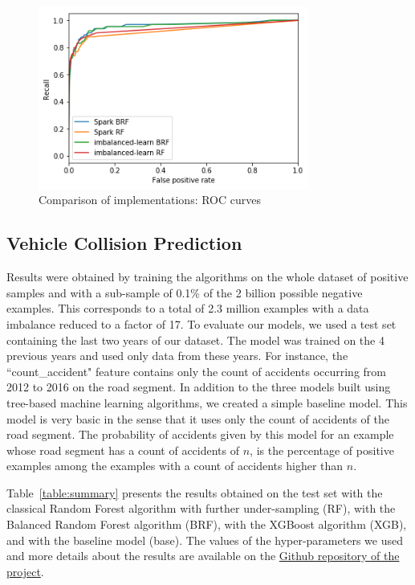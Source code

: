 \documentclass[conference]{IEEEtran}
\begin{document}
\begin{figure}[htbp]
\centerline{\includegraphics[height=6cm, keepaspectratio]{Figures/test_brf_roc.png}}
\caption{Comparison of implementations: ROC curves}
\label{fig:test-brf-roc}
\end{figure}

\subsection{Vehicle Collision Prediction}

Results were obtained by training the algorithms on the whole
dataset of positive samples and with a sub-sample of 0.1\% of the 2
billion possible negative examples. This corresponds to a total of 2.3
million examples with a data imbalance reduced to a factor of 17. To
evaluate our models, we used a test set containing the last two years of our
dataset. The model was trained on the 4 previous years and used only data
from these years. For instance, the ``count\_accident" feature contains only
the count of accidents occurring from 2012 to 2016 on the road segment.
In addition to the three models built using tree-based machine learning algorithms,
we created a simple baseline model. This model is very basic in the sense that it uses
only the count of accidents of the road segment.
The probability of accidents given 
by this model for an example whose road segment has a count of accidents of $n$, is the percentage
of positive examples among the examples with a count of accidents higher than $n$.

Table~\ref{table:summary} presents the results obtained on the test set with the classical
Random Forest algorithm with further under-sampling (RF), with the Balanced Random Forest algorithm (BRF), with the XGBoost algorithm (XGB), and with the baseline model (base). The values of the hyper-parameters we used and more details about the results are available on the \href{https://github.com/big-data-lab-team/accident-prediction-montreal/tree/master/results}{Github repository of the project}.
\end{document}
